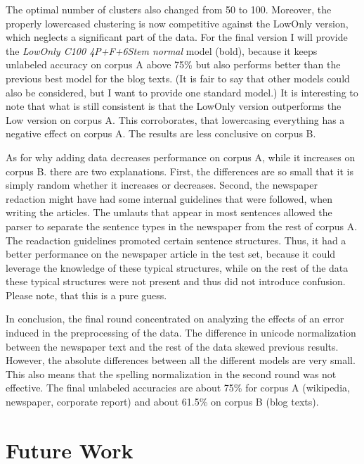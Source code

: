 \documentclass[11pt,letterpaper, covington]{article}
\begin{document}
The optimal number of clusters also changed from 50 to 100. Moreover, the properly lowercased clustering is now competitive against the LowOnly version, which neglects a significant part of the data. For the final version I will provide the \emph{LowOnly C100 4P+F+6Stem normal} model (bold), because it keeps unlabeled accuracy on corpus A above 75\% but also performs better than the previous best model for the blog texts. (It is fair to say that other models could also be considered, but I want to provide one standard model.) It is interesting to note that what is still consistent is that the LowOnly version outperforms the Low version on corpus A. This corroborates, that lowercasing everything has a negative effect on corpus A. The results are less conclusive on corpus B.
 
As for why adding data decreases performance on corpus A, while it increases on corpus B. there are two explanations. First, the differences are so small that it is simply random whether it increases or decreases. Second, the newspaper redaction might have had some internal guidelines that were followed, when writing the articles. The umlauts that appear in most sentences allowed the parser to separate the sentence types in the newspaper from the rest of corpus A. The readaction guidelines promoted certain sentence structures. Thus, it had a better performance on the newspaper article in the test set, because it could leverage the knowledge of these typical structures, while on the rest of the data these typical structures were not present and thus did not introduce confusion. Please note, that this is a pure guess.


In conclusion, the final round concentrated on analyzing the effects of an error induced in the preprocessing of the data. The difference in unicode normalization between the newspaper text and the rest of the data skewed previous results. However, the absolute differences between all the different models are very small. This also means that the spelling normalization in the second round was not effective. The final unlabeled accuracies are about 75\% for corpus A (wikipedia, newspaper, corporate report) and about 61.5\% on corpus B (blog texts).

\section{Future Work}
\end{document}
